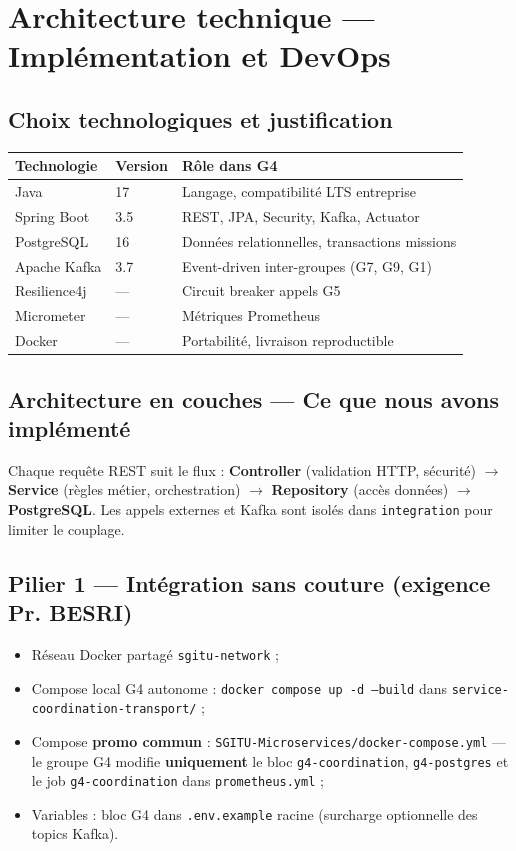 \documentclass[12pt,a4paper]{report}
\begin{document}
\chapter{Architecture technique — Implémentation et DevOps}

\section{Choix technologiques et justification}
\begin{center}
\small
\begin{tabular}{@{}llp{7.5cm}@{}}
\toprule
\textbf{Technologie} & \textbf{Version} & \textbf{Rôle dans G4} \\
\midrule
Java & 17 & Langage, compatibilité LTS entreprise \\
Spring Boot & 3.5 & REST, JPA, Security, Kafka, Actuator \\
PostgreSQL & 16 & Données relationnelles, transactions missions \\
Apache Kafka & 3.7 & Event-driven inter-groupes (G7, G9, G1) \\
Resilience4j & — & Circuit breaker appels G5 \\
Micrometer & — & Métriques Prometheus \\
Docker & — & Portabilité, livraison reproductible \\
\bottomrule
\end{tabular}
\end{center}

\section{Architecture en couches — Ce que nous avons implémenté}
Chaque requête REST suit le flux : \textbf{Controller} (validation HTTP, sécurité) $\rightarrow$ \textbf{Service} (règles métier, orchestration) $\rightarrow$ \textbf{Repository} (accès données) $\rightarrow$ \textbf{PostgreSQL}. Les appels externes et Kafka sont isolés dans \texttt{integration} pour limiter le couplage.

\section{Pilier 1 — Intégration sans couture (exigence Pr. BESRI)}
\begin{itemize}[leftmargin=*]
    \item Réseau Docker partagé \texttt{sgitu-network} ;
    \item Compose local G4 autonome : \texttt{docker compose up -d --build} dans \texttt{service-coordination-transport/} ;
    \item Compose \textbf{promo commun} : \texttt{SGITU-Microservices/docker-compose.yml} — le groupe G4 modifie \textbf{uniquement} le bloc \texttt{g4-coordination}, \texttt{g4-postgres} et le job \texttt{g4-coordination} dans \texttt{prometheus.yml} ;
    \item Variables : bloc G4 dans \texttt{.env.example} racine (surcharge optionnelle des topics Kafka).
\end{itemize}
\end{document}
